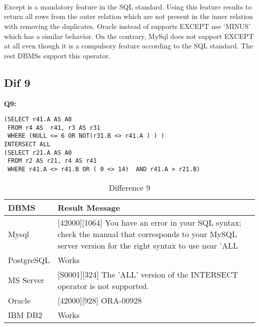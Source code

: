 \hfill\\\\\\
Except is a mandatory feature in the  SQL standard. Using this feature results to return all rows from the outer relation which are not present in the inner relation with removing the duplicates.  Oracle instead of supports EXCEPT use ‘MINUS’ which has a similar behavior. On the contrary, MySql does not support EXCEPT at all even though it is a compulsory feature according to the SQL standard. The rest DBMSs support this operator. 

\subsection{Dif 9}
  
\textbf{Q9:}
\begin{mdframed}[backgroundcolor=lightgray!20]
\begin{lstlisting}[style=SQL]
(SELECT r41.A AS A0
 FROM r4 AS  r41, r3 AS r31
 WHERE (NULL <= 6 OR NOT(r31.B <> r41.A ) ) )
INTERSECT ALL
(SELECT r21.A AS A0
 FROM r2 AS r21, r4 AS r41
 WHERE r41.A <> r41.B OR ( 0 <> 14)  AND r41.A > r21.B)
\end{lstlisting}
\end{mdframed}

 
\begin{table}[h]
\centering
\caption{Difference 9}
\label{my-label}
\begin{tabular}{|p{2cm}|p{11.5cm}| }
\hline
\textbf{DBMS} & \textbf{Result Message}                                                                                                                                          \\ \hline
Mysql         & {[}42000{]}{[}1064{]} You have an error in your SQL syntax; check the manual that corresponds to your MySQL server version for the right syntax to use near 'ALL \\ \hline
PostgreSQL    & Works                                                                                                                                                            \\ \hline
MS Server     & {[}S0001{]}{[}324{]} The 'ALL' version of the INTERSECT operator is not supported.                                                                               \\ \hline
Oracle        & {[}42000{]}{[}928{]} ORA-00928                                                                                                                                   \\ \hline
IBM DB2       & Works                                                                                                                                                            \\ \hline
\end{tabular}
\end{table}

